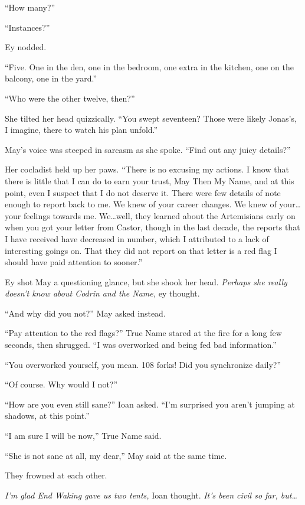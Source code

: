 ``How many?''

``Instances?''

Ey nodded.

``Five. One in the den, one in the bedroom, one extra in the kitchen, one on the balcony, one in the yard.''

``Who were the other twelve, then?''

She tilted her head quizzically. ``You swept seventeen? Those were likely Jonas's, I imagine, there to watch his plan unfold.''

May's voice was steeped in sarcasm as she spoke. ``Find out any juicy details?''

Her cocladist held up her paws. ``There is no excusing my actions. I know that there is little that I can do to earn your trust, May Then My Name, and at this point, even I suspect that I do not deserve it. There were few details of note enough to report back to me. We knew of your career changes. We knew of your\ldots your feelings towards me. We\ldots well, they learned about the Artemisians early on when you got your letter from Castor, though in the last decade, the reports that I have received have decreased in number, which I attributed to a lack of interesting goings on. That they did not report on that letter is a red flag I should have paid attention to sooner.''

Ey shot May a questioning glance, but she shook her head. \emph{Perhaps she really doesn't know about Codrin and the Name,} ey thought.

``And why did you not?'' May asked instead.

``Pay attention to the red flags?'' True Name stared at the fire for a long few seconds, then shrugged. ``I was overworked and being fed bad information.''

``You overworked yourself, you mean. 108 forks! Did you synchronize daily?''

``Of course. Why would I not?''

``How are you even still sane?'' Ioan asked. ``I'm surprised you aren't jumping at shadows, at this point.''

``I am sure I will be now,'' True Name said.

``She is not sane at all, my dear,'' May said at the same time.

They frowned at each other.

\emph{I'm glad End Waking gave us two tents,} Ioan thought. \emph{It's been civil so far, but\ldots{}}

